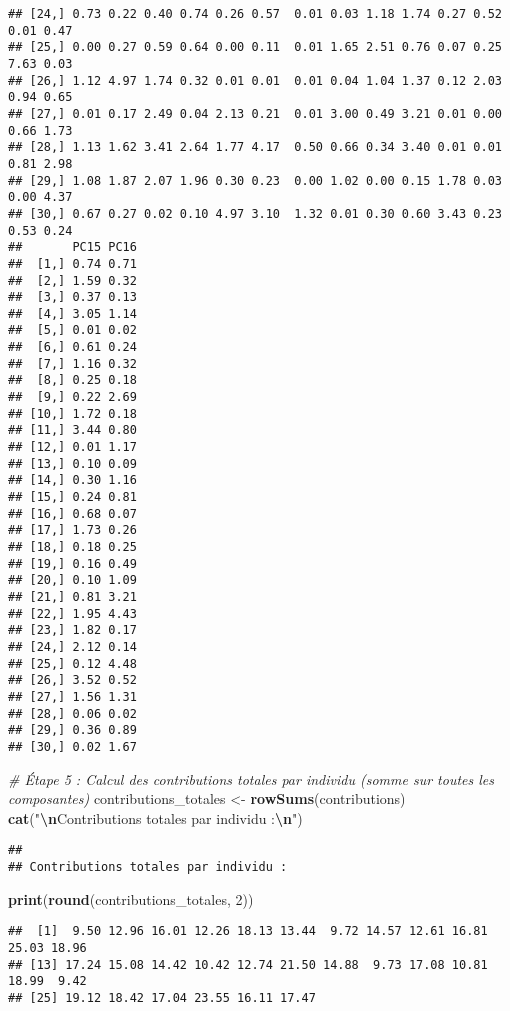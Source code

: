 \documentclass[
]{article}
\newenvironment{Shaded}{\begin{snugshade}}{\end{snugshade}}
\newcommand{\CommentTok}[1]{\textcolor[rgb]{0.56,0.35,0.01}{\textit{#1}}}
\newcommand{\DecValTok}[1]{\textcolor[rgb]{0.00,0.00,0.81}{#1}}
\newcommand{\FunctionTok}[1]{\textcolor[rgb]{0.13,0.29,0.53}{\textbf{#1}}}
\newcommand{\NormalTok}[1]{#1}
\newcommand{\OtherTok}[1]{\textcolor[rgb]{0.56,0.35,0.01}{#1}}
\newcommand{\SpecialCharTok}[1]{\textcolor[rgb]{0.81,0.36,0.00}{\textbf{#1}}}
\newcommand{\StringTok}[1]{\textcolor[rgb]{0.31,0.60,0.02}{#1}}
\begin{document}
\begin{verbatim}
## [24,] 0.73 0.22 0.40 0.74 0.26 0.57  0.01 0.03 1.18 1.74 0.27 0.52 0.01 0.47
## [25,] 0.00 0.27 0.59 0.64 0.00 0.11  0.01 1.65 2.51 0.76 0.07 0.25 7.63 0.03
## [26,] 1.12 4.97 1.74 0.32 0.01 0.01  0.01 0.04 1.04 1.37 0.12 2.03 0.94 0.65
## [27,] 0.01 0.17 2.49 0.04 2.13 0.21  0.01 3.00 0.49 3.21 0.01 0.00 0.66 1.73
## [28,] 1.13 1.62 3.41 2.64 1.77 4.17  0.50 0.66 0.34 3.40 0.01 0.01 0.81 2.98
## [29,] 1.08 1.87 2.07 1.96 0.30 0.23  0.00 1.02 0.00 0.15 1.78 0.03 0.00 4.37
## [30,] 0.67 0.27 0.02 0.10 4.97 3.10  1.32 0.01 0.30 0.60 3.43 0.23 0.53 0.24
##       PC15 PC16
##  [1,] 0.74 0.71
##  [2,] 1.59 0.32
##  [3,] 0.37 0.13
##  [4,] 3.05 1.14
##  [5,] 0.01 0.02
##  [6,] 0.61 0.24
##  [7,] 1.16 0.32
##  [8,] 0.25 0.18
##  [9,] 0.22 2.69
## [10,] 1.72 0.18
## [11,] 3.44 0.80
## [12,] 0.01 1.17
## [13,] 0.10 0.09
## [14,] 0.30 1.16
## [15,] 0.24 0.81
## [16,] 0.68 0.07
## [17,] 1.73 0.26
## [18,] 0.18 0.25
## [19,] 0.16 0.49
## [20,] 0.10 1.09
## [21,] 0.81 3.21
## [22,] 1.95 4.43
## [23,] 1.82 0.17
## [24,] 2.12 0.14
## [25,] 0.12 4.48
## [26,] 3.52 0.52
## [27,] 1.56 1.31
## [28,] 0.06 0.02
## [29,] 0.36 0.89
## [30,] 0.02 1.67
\end{verbatim}

\begin{Shaded}
\begin{Highlighting}[]
\CommentTok{\# Étape 5 : Calcul des contributions totales par individu (somme sur toutes les composantes)}
\NormalTok{contributions\_totales }\OtherTok{\textless{}{-}} \FunctionTok{rowSums}\NormalTok{(contributions)}
\FunctionTok{cat}\NormalTok{(}\StringTok{"}\SpecialCharTok{\textbackslash{}n}\StringTok{Contributions totales par individu :}\SpecialCharTok{\textbackslash{}n}\StringTok{"}\NormalTok{)}
\end{Highlighting}
\end{Shaded}

\begin{verbatim}
## 
## Contributions totales par individu :
\end{verbatim}

\begin{Shaded}
\begin{Highlighting}[]
\FunctionTok{print}\NormalTok{(}\FunctionTok{round}\NormalTok{(contributions\_totales, }\DecValTok{2}\NormalTok{))}
\end{Highlighting}
\end{Shaded}

\begin{verbatim}
##  [1]  9.50 12.96 16.01 12.26 18.13 13.44  9.72 14.57 12.61 16.81 25.03 18.96
## [13] 17.24 15.08 14.42 10.42 12.74 21.50 14.88  9.73 17.08 10.81 18.99  9.42
## [25] 19.12 18.42 17.04 23.55 16.11 17.47
\end{verbatim}
\end{document}
